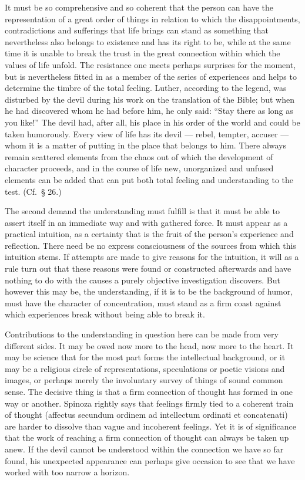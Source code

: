 \documentclass[12pt]{book}
\newcommand{\opage}[1]{\marginnote{\footnotesize\textit{[#1]}}}
\begin{document}
It must be so comprehensive and so coherent that the person can have the representation of
a great order of things in relation to which the disappointments, contradictions and
sufferings that life brings can stand as something that nevertheless also belongs to
existence and has its right to be, while at the same time it is unable to break the trust
in the great connection within which the values of life unfold. The resistance one meets
perhaps surprises for the moment, but is nevertheless fitted in as a member of the series
of experiences and helps to determine the timbre of the total feeling. Luther, according
to the legend, was disturbed by the devil during his work on the translation of the Bible;
but when he had discovered whom he had before him, he only said: ``Stay there as long as
you like!'' The devil had, after all, his place in his order of the world and could be
taken humorously. Every view of life has its devil --- rebel, tempter, accuser --- whom it
is a matter of putting in the place that belongs to him. There always remain scattered
elements from the chaos out of which the development of character proceeds, and in the
course of life new, unorganized and unfused elements can be added that can put both total
feeling and understanding to the test. (Cf.\ § 26.)

The second demand the understanding must fulfill is that it must be able to assert itself
in an immediate way and with \opage{113}gathered force. It must appear as a practical
intuition, as a certainty that is the fruit of the person's experience and reflection.
There need be no express consciousness of the sources from which this intuition stems. If
attempts are made to give reasons for the intuition, it will as a rule turn out that these
reasons were found or constructed afterwards and have nothing to do with the causes a
purely objective investigation discovers. But however this may be, the understanding, if
it is to be the background of humor, must have the character of concentration, must stand
as a firm coast against which experiences break without being able to break it.

Contributions to the understanding in question here can be made from very different sides.
It may be owed now more to the head, now more to the heart. It may be science that for the
most part forms the intellectual background, or it may be a religious circle of
representations, speculations or poetic visions and images, or perhaps merely the
involuntary survey of things of sound common sense. The decisive thing is that a firm
connection of thought has formed in one way or another. Spinoza rightly says that feelings
firmly tied to a coherent train of thought (affectus secundum ordinem ad intellectum
ordinati et concatenati) are harder to dissolve than vague and incoherent feelings. Yet it
is of significance that the work of reaching a firm connection of thought can always be
taken up anew. If the devil cannot be understood within the connection we have so far
found, his unexpected appearance can perhaps give occasion to see that we have worked with
too narrow a horizon.
\end{document}

